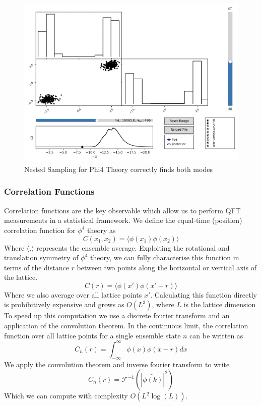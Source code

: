 \documentclass[11pt]{article}
\begin{document}
    \begin{figure}[H]
        \centering
        \includegraphics[width=0.75\linewidth]{../figures/phi4_anesthetic}
        \caption{Nested Sampling for Phi4 Theory correctly finds both modes}
        \label{fig:phi4anesthetic}
    \end{figure}

    \subsubsection{Correlation Functions}
    Correlation functions are the key observable which allow us to perform QFT measurements in a statistical framework.
    We define the equal-time (position) correlation function for $\phi^4$ theory as
    \[
        C(x_1, x_2) = \langle \phi(x_1) \phi(x_2) \rangle
    \]
    Where $\langle . \rangle$ represents the ensemble average.
    Exploiting the rotational and translation symmetry of $\phi^4$ theory, we can fully characterise this function
    in terms of the distance $r$ between two points along the horizontal or vertical axis of the lattice.
    \[
        C(r) = \langle \phi(x') \phi(x' + r) \rangle
    \]
    Where we also average over all lattice points $x'$.
    Calculating this function directly is prohibitively expensive and grows as $O(L^3)$, where $L$ is the lattice dimension\\

    To speed up this computation we use a discrete fourier transform and an application of the convolution theorem. \cite{Ruge_1994}
    In the continuous limit, the correlation function over all lattice points for a single ensemble state $n$ can be written as
    \[
        C_n(r) = \int_{-\infty}^{\infty} \phi(x) \phi(x - r) dx
    \]
    We apply the convolution theorem and inverse fourier transform to write
    \[
        C_n(r) = \mathcal{F}^{-1} \left( | \widetilde{\phi(k)} |^2 \right)
    \]
    Which we can compute with complexity $O(L^2 \log(L))$.
\end{document}
